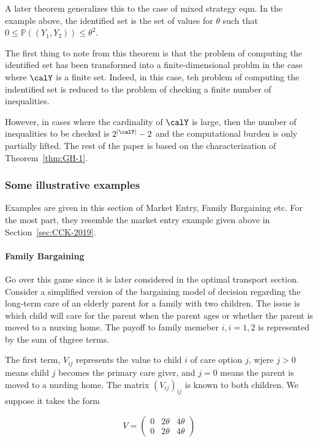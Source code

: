 A later theorem generalizes this to the case of mixed strategy eqm. In the example above, the identified set is the set of values for $\theta$ such that $0 \leq \mathbb{P}((Y_1,Y_2)) \leq \theta^2$.

The first thing to note from this theorem is that the problem of computing the identified set has been transformed into a finite-dimensional problm in the case where $\calY$ is a finite set. Indeed, in this case, teh problem of computing the indentified set is reduced to the problem of checking a finite number of inequalities. 

However, in cases where the cardinality of $\calY$ is large, then the number of inequalities to be checked is $2^{|\calY|} - 2$ and the computational burden is only partially lifted. The rest of the paper is based on the characterization of Theorem~\ref{thm:GH-1}. 
\subsubsection{Some illustrative examples}

Examples are given in this section of Market Entry, Family Bargaining etc. For the most part, they resemble the market entry example given above in Section~\ref{sec:CCK-2019}. 

\paragraph{Family Bargaining}

Go over this game since it is later considered in the optimal transport section. Consider a simplified version of the bargaining model of decision regarding the long-term care of an elderly parent for a family with two children. The issue is which child will care for the parent when the parent ages or whether the parent is moved to a nursing home. The payoff to family memeber $i, i = 1,2$ is represented by the sum of thgree terms. 

The first term, $V_{ij}$ represents the value to child $i$ of care option $j$, wjere $j > 0$ means child $j$ becomes the primary care giver, and $j= 0$ means the parent is moved to a nurding home. The matrix $(V_{ij})_{ij}$ is known to both children. We suppose it takes the form 

\[V = \begin{pmatrix} 0 & 2\theta & 4\theta \\0 & 2\theta & 4\theta  \end{pmatrix}\]

